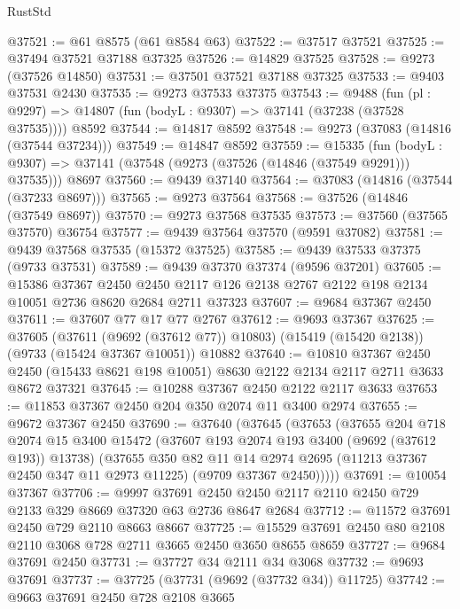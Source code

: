\begin{lexlean}{RustStd}
\begin{coremodule}
{\begin{coremodule}
{{{{{{{{{{{{{{{{{{{{{{{{{{{{{{{{{{{{{{{{{{{{{{{{{{{{{{{@37521 := @61 @8575 (@61 @8584 @63)
@37522 := @37517 @37521
@37525 := @37494 @37521 @37188 @37325
@37526 := @14829 @37525
@37528 := @9273 (@37526 @14850)
@37531 := @37501 @37521 @37188 @37325
@37533 := @9403 @37531 @2430
@37535 := @9273 @37533 @37375
@37543 := @9488
    (fun (pl : @9297) => @14807 (fun (bodyL : @9307) => @37141 (@37238 (@37528 @37535))))
    @8592
@37544 := @14817 @8592
@37548 := @9273 (@37083 (@14816 (@37544 @37234)))
@37549 := @14847 @8592
@37559 := @15335
    (fun (bodyL : @9307) => @37141 (@37548 (@9273 (@37526 (@14846 (@37549 @9291))) @37535)))
    @8697
@37560 := @9439 @37140
@37564 := @37083 (@14816 (@37544 (@37233 @8697)))
@37565 := @9273 @37564
@37568 := @37526 (@14846 (@37549 @8697))
@37570 := @9273 @37568 @37535
@37573 := @37560 (@37565 @37570) @36754
@37577 := @9439 @37564 @37570 (@9591 @37082)
@37581 := @9439 @37568 @37535 (@15372 @37525)
@37585 := @9439 @37533 @37375 (@9733 @37531)
@37589 := @9439 @37370 @37374 (@9596 @37201)
@37605 := @15386
    @37367
    @2450
    @2450
    @2117
    @126
    @2138
    @2767
    @2122
    @198
    @2134
    @10051
    @2736
    @8620
    @2684
    @2711
    @37323
@37607 := @9684 @37367 @2450
@37611 := @37607 @77 @17 @77 @2767
@37612 := @9693 @37367
@37625 := @37605
    (@37611 (@9692 (@37612 @77)) @10803)
    (@15419 (@15420 @2138))
    (@9733 (@15424 @37367 @10051))
    @10882
@37640 := @10810
    @37367
    @2450
    @2450
    (@15433 @8621 @198 @10051)
    @8630
    @2122
    @2134
    @2117
    @2711
    @3633
    @8672
    @37321
@37645 := @10288 @37367 @2450 @2122 @2117 @3633
@37653 := @11853 @37367 @2450 @204 @350 @2074 @11 @3400 @2974
@37655 := @9672 @37367 @2450
@37690 := @37640
    (@37645
      (@37653
        (@37655
          @204
          @718
          @2074
          @15
          @3400
          @15472
          (@37607 @193 @2074 @193 @3400 (@9692 (@37612 @193)) @13738)
          (@37655
            @350
            @82
            @11
            @14
            @2974
            @2695
            (@11213 @37367 @2450 @347 @11 @2973 @11225)
            (@9709 @37367 @2450)))))
@37691 := @10054 @37367
@37706 := @9997
    @37691
    @2450
    @2450
    @2117
    @2110
    @2450
    @729
    @2133
    @329
    @8669
    @37320
    @63
    @2736
    @8647
    @2684
@37712 := @11572 @37691 @2450 @729 @2110 @8663 @8667
@37725 := @15529 @37691 @2450 @80 @2108 @2110 @3068 @728 @2711 @3665 @2450 @3650 @8655 @8659
@37727 := @9684 @37691 @2450
@37731 := @37727 @34 @2111 @34 @3068
@37732 := @9693 @37691
@37737 := @37725 (@37731 (@9692 (@37732 @34)) @11725)
@37742 := @9663 @37691 @2450 @728 @2108 @3665
}}}}}}}}}}}}}}}}}}}}}}}}}}}}}}}}}}}}}}}}}}}}}}}}}}}}}}}
\end{coremodule}}
\end{coremodule}
\end{lexlean}
